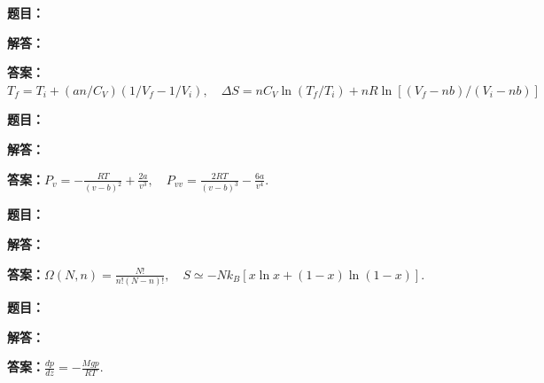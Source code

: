 \documentclass[lang=cn,color=blue,11pt]{elegantbook}
\begin{document}
\par
\noindent\textbf{题目：}
\par\noindent\textbf{解答：}
\par\noindent\textbf{答案：}\(\displaystyle T_f=T_i+(an/C_V)(1/V_f-1/V_i),\quad\Delta S=nC_V\ln(T_f/T_i)+nR\ln[(V_f-nb)/(V_i-nb)]\)\par
\par\smallskip\noindent\hrulefill\par\medskip
{}\par
\noindent\textbf{题目：}
\par\noindent\textbf{解答：}
\par\noindent\textbf{答案：}\(\displaystyle 
P_v=-\frac{RT}{(v-b)^2}+\frac{2a}{v^3},\quad
P_{vv}=\frac{2RT}{(v-b)^3}-\frac{6a}{v^4}.
\)\par
\par\smallskip\noindent\hrulefill\par\medskip
{}\par
\noindent\textbf{题目：}
\par\noindent\textbf{解答：}
\par\noindent\textbf{答案：}\(\displaystyle 
\Omega(N,n)=\frac{N!}{n!(N-n)!},\quad
S\simeq-Nk_B[x\ln x+(1-x)\ln(1-x)].
\)\par
\par\smallskip\noindent\hrulefill\par\medskip
{}\par
\noindent\textbf{题目：}
\par\noindent\textbf{解答：}
\par\noindent\textbf{答案：}\(\displaystyle 
\frac{dp}{dz}=-\frac{Mgp}{RT}.
\)\par
\par\smallskip\noindent\hrulefill\par\medskip
\end{document}
